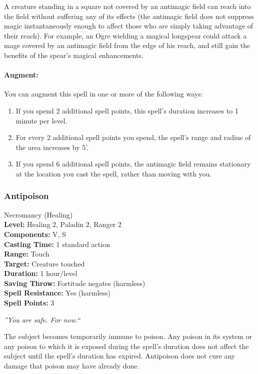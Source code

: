 A creature standing in a square not covered by an antimagic field can reach into the field without suffering any of its effects
(the antimagic field does not suppress magic instantaneously enough to affect those who are simply taking advantage of their reach).
For example, an Ogre wielding a magical longspear could attack a mage covered by an antimagic field from the edge of his reach, 
and still gain the benefits of the spear's magical enhancements.

\paragraph{Augment:} You can augment this spell in one or more of the following ways:
\begin{enumerate}
 \item If you spend 2 additional spell points, this spell's duration increases to 1 minute per level.
 \item For every 2 additional spell points you spend, the spell's range and radius of the area increases by 5'.
 \item If you spend 6 additional spell points, the antimagic field remains stationary at the location you cast the spell,
 rather than moving with you.
\end{enumerate}
\subsubsection{Antipoison}
\label{Spell:Antipoison}
Necromancy (Healing)
\\ \textbf{Level:} Healing 2, Paladin 2, Ranger 2
\\ \textbf{Components:} V, S
\\ \textbf{Casting Time:} 1 standard action
\\ \textbf{Range:} Touch
\\ \textbf{Target:} Creature touched
\\ \textbf{Duration:} 1 hour/level
\\ \textbf{Saving Throw:} Fortitude negates (harmless)
\\ \textbf{Spell Resistance:} Yes (harmless)
\\ \textbf{Spell Points:} 3

\emph{''You are safe. For now.``}

The subject becomes temporarily immune to poison. 
Any poison in its system or any poison to which it is exposed during the spell's duration does not affect the subject until the spell's duration has expired. 
Antipoison does not cure any damage that poison may have already done.


